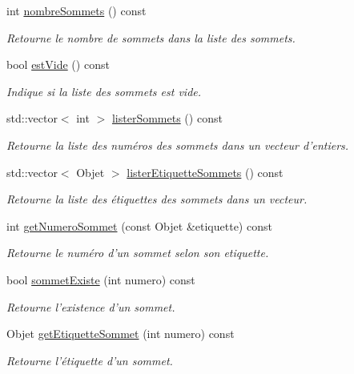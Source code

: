 \begin{DoxyCompactItemize}
int \hyperlink{class_graphe_a822c112c79faa409d2eeb95a9c2c4e7c}{nombreSommets} () const 
\begin{DoxyCompactList}\small\item\em Retourne le nombre de sommets dans la liste des sommets. \end{DoxyCompactList}\item 
bool \hyperlink{class_graphe_afd8eb5bce922c62b2d5814dd95decf3e}{estVide} () const 
\begin{DoxyCompactList}\small\item\em Indique si la liste des sommets est vide. \end{DoxyCompactList}\item 
std::vector$<$ int $>$ \hyperlink{class_graphe_aedac4305a983b11ea0420ba80343635e}{listerSommets} () const 
\begin{DoxyCompactList}\small\item\em Retourne la liste des numéros des sommets dans un vecteur d'entiers. \end{DoxyCompactList}\item 
std::vector$<$ Objet $>$ \hyperlink{class_graphe_a998f2dd61188d540e7789b6ea631e548}{listerEtiquetteSommets} () const 
\begin{DoxyCompactList}\small\item\em Retourne la liste des étiquettes des sommets dans un vecteur. \end{DoxyCompactList}\item 
int \hyperlink{class_graphe_a0de2ca6fa1f02d95fde97306217d2031}{getNumeroSommet} (const Objet \&etiquette) const 
\begin{DoxyCompactList}\small\item\em Retourne le numéro d'un sommet selon son etiquette. \end{DoxyCompactList}\item 
bool \hyperlink{class_graphe_af9a087a2a780133f651af51fb25de677}{sommetExiste} (int numero) const 
\begin{DoxyCompactList}\small\item\em Retourne l'existence d'un sommet. \end{DoxyCompactList}\item 
Objet \hyperlink{class_graphe_af6efac3e9c660c4aacfa05c6bcba7ddf}{getEtiquetteSommet} (int numero) const 
\begin{DoxyCompactList}\small\item\em Retourne l'étiquette d'un sommet. \end{DoxyCompactList}\item 

\end{DoxyCompactItemize}
